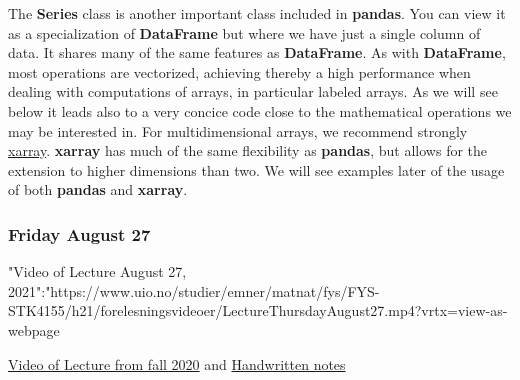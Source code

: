 \documentclass{beamer}
\begin{document}
\begin{frame}
The \textbf{Series} class is another important class included in
\textbf{pandas}. You can view it as a specialization of \textbf{DataFrame} but where
we have just a single column of data. It shares many of the same features as \textbf{DataFrame}. As with \textbf{DataFrame},
most operations are vectorized, achieving thereby a high performance when dealing with computations of arrays, in particular labeled arrays.
As we will see below it leads also to a very concice code close to the mathematical operations we may be interested in.
For multidimensional arrays, we recommend strongly \href{{http://xarray.pydata.org/en/stable/}}{xarray}. \textbf{xarray} has much of the same flexibility as \textbf{pandas}, but allows for the extension to higher dimensions than two. We will see examples later of the usage of both \textbf{pandas} and \textbf{xarray}.
\end{frame}

\begin{frame}
\frametitle{Friday August 27}

"Video of Lecture August 27, 2021":"https://www.uio.no/studier/emner/matnat/fys/FYS-STK4155/h21/forelesningsvideoer/LectureThursdayAugust27.mp4?vrtx=view-as-webpage

\href{{https://www.uio.no/studier/emner/matnat/fys/FYS-STK3155/h20/forelesningsvideoer/LectureAug21.mp4?vrtx=view-as-webpage}}{Video of Lecture from fall 2020}  and \href{{https://github.com/CompPhysics/MachineLearning/blob/master/doc/HandWrittenNotes/NotesAugust21.pdf}}{Handwritten notes}
\end{frame}
\end{document}
